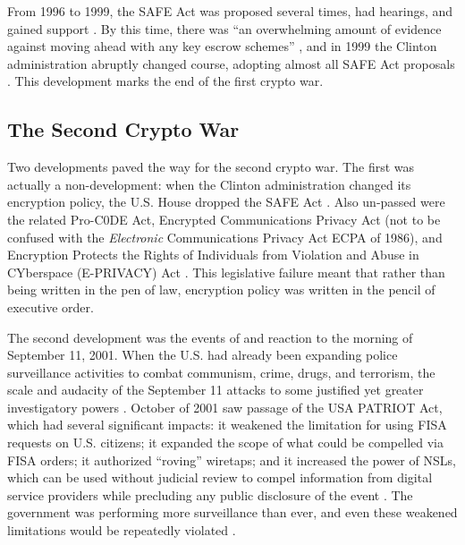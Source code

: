 From 1996 to 1999, the SAFE Act was proposed several times, had hearings, and gained support \cite{kehl_right_2015}. By
this time, there was ``an overwhelming amount of evidence against moving ahead with any key escrow schemes''
\cite{thompson_2015}, and in 1999 the Clinton administration abruptly changed course, adopting almost all SAFE Act
proposals \cite{kehl_right_2015}. This development marks the end of the first crypto war.

\subsection{The Second Crypto War}
\label{sec-history-cw2}

Two developments paved the way for the second crypto war. The first was actually a non-development: when the Clinton
administration changed its encryption policy, the U.S. House dropped the SAFE Act \cite{kehl_right_2015}. Also un-passed
were the related Pro-C0DE Act, Encrypted Communications Privacy Act (not to be confused with the \textit{Electronic}
Communications Privacy Act \acs{ECPA} of 1986), and Encryption Protects the Rights of Individuals from Violation and
Abuse in CYberspace (E-PRIVACY) Act \cite{leahy_s376_1997} \cite{ashcroft_s2067_1998}. This legislative failure meant
that rather than being written in the pen of law, encryption policy was written in the pencil of executive order.

The second development was the events of and reaction to the morning of September 11, 2001. When the U.S. had already
been expanding police surveillance activities to combat communism, crime, drugs, and terrorism, the scale and audacity
of the September 11 attacks to some justified yet greater investigatory powers \cite{bloss_escalating_2007}. October of
2001 saw passage of the USA PATRIOT Act, which had several significant impacts: it weakened the limitation for using
\ac{FISA} requests on U.S. citizens; it expanded the scope of what could be compelled via \ac{FISA} orders; it
authorized ``roving'' wiretaps; and it increased the power of \acp{NSL}, which can be used without judicial review to
compel information from digital service providers while precluding any public disclosure of the event
\cite{sensenbrenner_2001} \cite{shamsi_2011}. The government was performing more surveillance than ever, and even these
weakened limitations would be repeatedly violated \cite{shamsi_2011} \cite{tucker_2020}.

